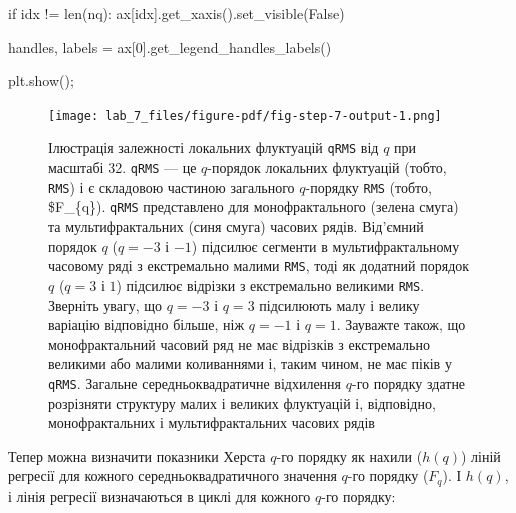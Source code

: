 \documentclass[
  letterpaper,
]{report}
\newenvironment{Shaded}{\begin{snugshade}}{\end{snugshade}}
\newcommand{\BuiltInTok}[1]{\textcolor[rgb]{0.00,0.23,0.31}{#1}}
\newcommand{\ControlFlowTok}[1]{\textcolor[rgb]{0.00,0.23,0.31}{#1}}
\newcommand{\DecValTok}[1]{\textcolor[rgb]{0.68,0.00,0.00}{#1}}
\newcommand{\NormalTok}[1]{\textcolor[rgb]{0.00,0.23,0.31}{#1}}
\newcommand{\OperatorTok}[1]{\textcolor[rgb]{0.37,0.37,0.37}{#1}}
\newcommand{\VariableTok}[1]{\textcolor[rgb]{0.07,0.07,0.07}{#1}}
\begin{document}
\begin{Shaded}
\begin{Highlighting}[]
    \ControlFlowTok{if}\NormalTok{ idx }\OperatorTok{!=} \BuiltInTok{len}\NormalTok{(nq): }
\NormalTok{        ax[idx].get\_xaxis().set\_visible(}\VariableTok{False}\NormalTok{)}

\NormalTok{handles, labels }\OperatorTok{=}\NormalTok{ ax[}\DecValTok{0}\NormalTok{].get\_legend\_handles\_labels()}

\NormalTok{plt.show()}\OperatorTok{;}
\end{Highlighting}
\end{Shaded}

\begin{figure}[H]

{\centering \texttt{[image: lab\_7\_files/figure-pdf/fig-step-7-output-1.png]}

}

\caption{\label{fig-step-7}Ілюстрація залежності локальних флуктуацій
\texttt{qRMS} від \(q\) при масштабі 32. \texttt{qRMS} --- це
\(q\)-порядок локальних флуктуацій (тобто, \texttt{RMS}) і є складовою
частиною загального \(q\)-порядку \texttt{RMS} (тобто, \$F\_\{q\}).
\texttt{qRMS} представлено для монофрактального (зелена смуга) та
мультифрактальних (синя смуга) часових рядів. Від'ємний порядок \(q\)
(\(q = -3\) і \(-1\)) підсилює сегменти в мультифрактальному часовому
ряді з екстремально малими \texttt{RMS}, тоді як додатний порядок \(q\)
(\(q = 3\) і \(1\)) підсилює відрізки з екстремально великими
\texttt{RMS}. Зверніть увагу, що \(q = -3\) і \(q = 3\) підсилюють малу
і велику варіацію відповідно більше, ніж \(q = -1\) і \(q = 1\).
Зауважте також, що монофрактальний часовий ряд не має відрізків з
екстремально великими або малими коливаннями і, таким чином, не має
піків у \texttt{qRMS}. Загальне середньоквадратичне відхилення \(q\)-го
порядку здатне розрізняти структуру малих і великих флуктуацій і,
відповідно, монофрактальних і мультифрактальних часових рядів}

\end{figure}

Тепер можна визначити показники Херста \(q\)-го порядку як нахили
(\(h(q)\)) ліній регресії для кожного середньоквадратичного значення
\(q\)-го порядку (\(F_{q}\)). І \(h(q)\), і лінія регресії визначаються
в циклі для кожного \(q\)-го порядку:
\end{document}
